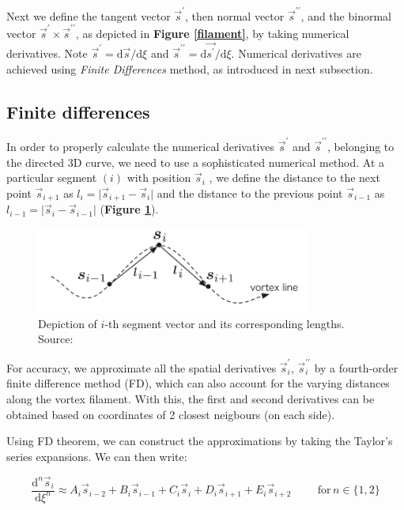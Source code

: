 Next we define the tangent vector $\vec{s}^{\prime}$, then normal vector $\vec{s}^{\prime\prime}$, and the binormal vector $\vec{s}^{\prime} \times \vec{s}^{\prime\prime}$, as depicted in \textbf{Figure \ref{filament}}, by taking numerical derivatives.
Note $\vec{s}^{\prime} = \text{d}\vec{s} / \text{d}\xi$ and $\vec{s}^{\prime\prime} = \text{d}\vec{s^{\prime}} / \text{d}\xi$.
Numerical derivatives are achieved using \textit{Finite Differences} method, as introduced in next subsection.


\subsection*{Finite differences}

In order to properly calculate the numerical derivatives $\vec{s}^{\prime}$ and $\vec{s}^{\prime\prime}$, belonging to the directed 3D curve, we need to use a sophisticated numerical method.
At a particular segment $(i)$ with position $\vec{s}_i$ , we define the distance to the next point $\vec{s}_{i+1}$ as $l_{i} = \vert \vec{s}_{i+1} - \vec{s}_i \vert$ and the distance to the previous point $\vec{s}_{i-1}$ as $l_{i-1} = \vert \vec{s}_i - \vec{s}_{i-1} \vert$ (\textbf{Figure \ref{FD}}).

\begin{figure}[h]
	\centering
	\includegraphics[width=0.8\textwidth]{graphics/simul/finite-diff}
	\caption{Depiction of $i$-th segment vector and its corresponding lengths. Source: \cite{tsubota}}
	\label{FD}
\end{figure}

For accuracy, we approximate all the spatial derivatives $\vec{s}_i^{\prime}$, $\vec{s}_i^{\prime\prime}$ by a
fourth-order finite difference method (FD), which can also account for the varying distances along the vortex filament. With this, the first and second derivatives can be obtained based on coordinates of 2 closest neigbours (on each side).

Using FD theorem, we can construct the approximations by taking the Taylor's series expansions. We can then write:

\begin{equation}
\frac{\text{d}^n\vec{s}_i}{\text{d}\xi^n} \approx
A_i\vec{s}_{i-2} +
B_i\vec{s}_{i-1} +
C_i\vec{s}_{i} +
D_i\vec{s}_{i+1} +
E_i\vec{s}_{i+2}
\hspace{1cm}
\text{for} \,n\in\{1,2\}
\label{FDcoeffs}
\end{equation}

